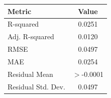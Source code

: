 \begin{tabular}{lc}
  \toprule
  \textbf{Metric} & \textbf{Value} \\ 
  \midrule
  R-squared & 0.0251 \\ 
  Adj. R-squared & 0.0120 \\ 
  RMSE & 0.0497 \\ 
  MAE & 0.0254 \\ 
  Residual Mean & $>$-0.0001 \\ 
  Residual Std. Dev. & 0.0497 \\ 
  \bottomrule
\end{tabular}